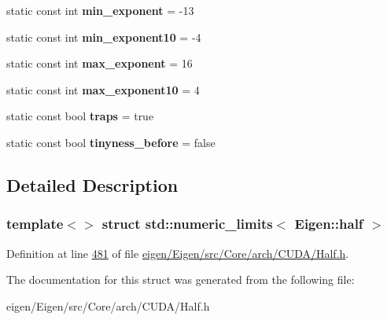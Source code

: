 \begin{DoxyCompactItemize}
static const int {\bfseries min\+\_\+exponent} = -\/13
\item 
\mbox{\label{structstd_1_1numeric__limits_3_01_eigen_1_1half_01_4_a5cbbd027ee979a4e70938927c0681709}} 
static const int {\bfseries min\+\_\+exponent10} = -\/4
\item 
\mbox{\label{structstd_1_1numeric__limits_3_01_eigen_1_1half_01_4_af9445da931d153309b9fab7ca8cb7fc4}} 
static const int {\bfseries max\+\_\+exponent} = 16
\item 
\mbox{\label{structstd_1_1numeric__limits_3_01_eigen_1_1half_01_4_a03d801ffeac72602835ecc8e4e64d298}} 
static const int {\bfseries max\+\_\+exponent10} = 4
\item 
\mbox{\label{structstd_1_1numeric__limits_3_01_eigen_1_1half_01_4_a6f12755f81d7dedfdefa0a9f4211b9da}} 
static const bool {\bfseries traps} = true
\item 
\mbox{\label{structstd_1_1numeric__limits_3_01_eigen_1_1half_01_4_a6af84d865173bf1b64106e47297cc8ca}} 
static const bool {\bfseries tinyness\+\_\+before} = false
\end{DoxyCompactItemize}


\subsection{Detailed Description}
\subsubsection*{template$<$$>$\newline
struct std\+::numeric\+\_\+limits$<$ Eigen\+::half $>$}



Definition at line \hyperlink{eigen_2_eigen_2src_2_core_2arch_2_c_u_d_a_2_half_8h_source_l00481}{481} of file \hyperlink{eigen_2_eigen_2src_2_core_2arch_2_c_u_d_a_2_half_8h_source}{eigen/\+Eigen/src/\+Core/arch/\+C\+U\+D\+A/\+Half.\+h}.



The documentation for this struct was generated from the following file\+:\begin{DoxyCompactItemize}
\item 
eigen/\+Eigen/src/\+Core/arch/\+C\+U\+D\+A/\+Half.\+h\end{DoxyCompactItemize}
